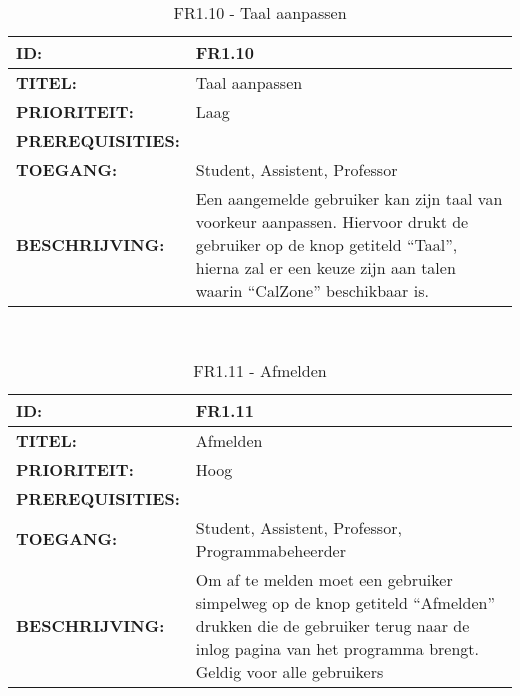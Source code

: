 \noindent\begin{table}[H]
            \begin{tabular}{l | p{10cm}}
                \textbf{ID:} & FR1.10 \\ \hline
                \textbf{TITEL:} & Taal aanpassen\\ \hline
                \textbf{PRIORITEIT:} &  Laag \\ \hline
                \textbf{PREREQUISITIES:} & \\ \hline
                \textbf{TOEGANG:} &  Student, Assistent, Professor \\ \hline
                \textbf{BESCHRIJVING:} & Een aangemelde gebruiker kan zijn taal van voorkeur aanpassen. 
                                        Hiervoor drukt de gebruiker op de knop getiteld “Taal”, hierna zal er een keuze zijn aan talen waarin “CalZone” beschikbaar is.\\ 
            \end{tabular}\\
            \caption{FR1.10 - Taal aanpassen}
            \label{tab:FR1.10 - Taal aanpassen}
        \end{table}

\noindent\begin{table}[H]
            \begin{tabular}{l | p{10cm}}
                \textbf{ID:} & FR1.11 \\ \hline
                \textbf{TITEL:} & Afmelden\\ \hline
                \textbf{PRIORITEIT:} &  Hoog \\ \hline
                \textbf{PREREQUISITIES:} & \\ \hline
                \textbf{TOEGANG:} &  Student, Assistent, Professor, Programmabeheerder \\ \hline
                \textbf{BESCHRIJVING:} & Om af te melden moet een gebruiker simpelweg op de knop getiteld “Afmelden” drukken die de gebruiker terug naar de inlog pagina van het programma brengt. Geldig voor alle gebruikers\\
            \end{tabular}\\
            \caption{FR1.11 - Afmelden}
            \label{tab:FR1.11 - Afmelden}
        \end{table}

